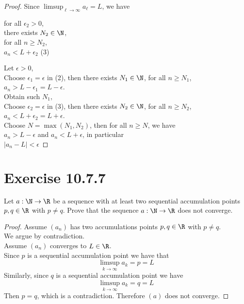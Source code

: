 \documentclass{article}
\begin{document}
\begin{proof}[Proof]
        Since $\limsup_{\ell\to\infty}a_\ell = L$, we have \\
        \begin{center}
            \parbox{\linewidth}{
                \linewidth
                for all $\epsilon_2 > 0$, \\
                \hspace*{1em}there exists $N_2 \in \N$, \\
                \hspace*{2em}for all $n \ge N_2$, \\
                \hspace*{3em}$a_n < L + \epsilon_2$
                \hfill (3)
            }
        \end{center}

        \noindent Let $\epsilon > 0$, \\
        Choose $\epsilon_1 = \epsilon$ in (2), then there exists $N_1 \in \N$, for all $n \ge N_1$, $a_n > L - \epsilon_1 = L - \epsilon$. \\
        Obtain such $N_1$, \\
        Choose $\epsilon_2 = \epsilon$ in (3), then there exists $N_2 \in \N$, for all $n \ge N_2$, $a_n < L + \epsilon_2 = L + \epsilon$. \\
        Choose $N = \max(N_1,N_2)$, then for all $n \ge N$, we have \\
        $a_n > L - \epsilon$ and $a_n < L + \epsilon$, in particular \\
        $|a_n - L| < \epsilon$

    \end{proof}

    \section{Exercise 10.7.7}
    \begin{problem}
        Let $a:\N \to \R$ be a sequence with at least two sequential accumulation points $p, q \in \R$ with $p \ne q$.
        Prove that the sequence $a: \N \to \R$ does not converge.
    \end{problem}
    \begin{proof}[Proof]
        Assume $(a_n)$ has two accumulations points $p,q \in \R$ with $p \ne q$. \\

        We argue by contradiction. \\
        Assume $(a_n)$ converges to $L \in \R$. \\
        Since $p$ is a sequential accumulation point we have that 
        $$\limsup_{k\to\infty}a_k = p = L$$
        Similarly, since $q$ is a sequential accumulation point we have
        $$\limsup_{k\to\infty}a_k = q = L$$
        Then $p = q$, which is a contradiction.
        Therefore $(a)$ does not converge.
    \end{proof}
\end{document}
